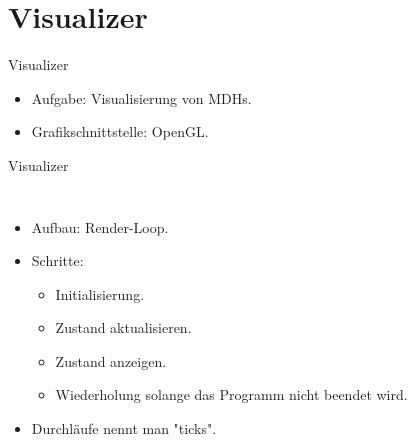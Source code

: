 \documentclass{presentation}
\begin{document}
\section{Visualizer}

\begin{frame}{Visualizer}
    \begin{itemize}
        \item Aufgabe: Visualisierung von MDHs.
        \item Grafikschnittstelle: OpenGL.
    \end{itemize}
\end{frame}

\begin{frame}{Visualizer}
    \begin{columns}
        \begin{itemize}
            \item Aufbau: Render-Loop.
            \item Schritte:
            \begin{itemize}
                \item Initialisierung.
                \item Zustand aktualisieren.
                \item Zustand anzeigen.
                \item Wiederholung solange das Programm nicht beendet wird.
            \end{itemize}
        	\item Durchläufe nennt man "ticks".
        \end{itemize}
        \begin{figure}

\end{figure}
\end{columns}
\end{frame}
\end{document}

